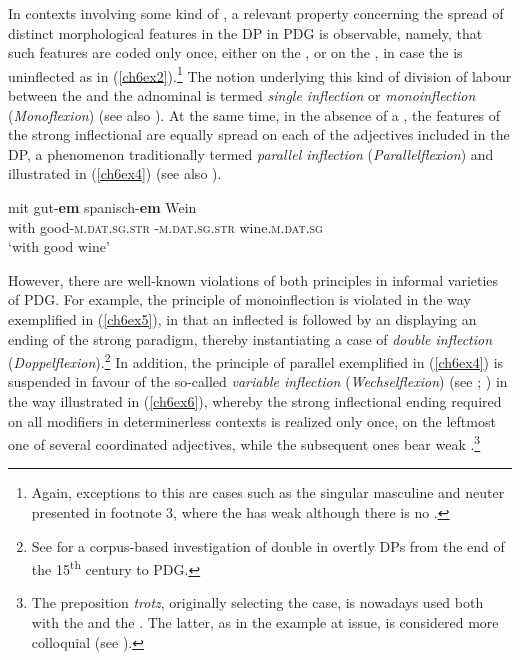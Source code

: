 \documentclass[output=paper,colorlinks,citecolor=brown]{langscibook}
\begin{document}
In contexts involving some kind of , a relevant property
concerning the spread of distinct morphological features in the DP in
PDG is observable, namely, that such features are coded only once, either
on the , or on the , in case the  is
uninflected as in (\ref{ch6ex2}).\footnote{Again, exceptions to this  are
  cases such as the  singular masculine and neuter presented in
  footnote 3, where the  has weak  although there is
  no .} The notion underlying this kind of division of labour
between the  and the adnominal  is termed
\emph{single inflection} or \emph{monoinflection} (\emph{Monoflexion})
(see also \citealp[954]{Duden16}). At the same time, in the absence of a
, the features of the strong inflectional  are equally
spread on each of the adjectives included in the DP, a phenomenon
traditionally termed \emph{parallel inflection} (\emph{Parallelflexion})
and illustrated in (\ref{ch6ex4}) (see also \citealp{Bildhauer2019}).

\begin{exe}
\ex\label{ch6ex4}
\gll mit gut-\textbf{em} spanisch-\textbf{em} Wein\\
with good-\textsc{m.dat.sg.str} -\textsc{m.dat.sg.str} wine.\textsc{m.dat.sg}\\
\glt `with good  wine'
\end{exe}

However, there are well-known violations of both principles in informal
varieties of PDG. For example, the principle of monoinflection is
violated in the way exemplified in (\ref{ch6ex5}), in that an inflected 
is followed by an  displaying an ending of the strong paradigm,
thereby instantiating a case of \emph{double inflection}
(\emph{Doppelflexion}).\footnote{See \cite{Niebuhr21} for a corpus-based
  investigation of double  in overtly  DPs from the
  end of the 15\textsuperscript{th} century to PDG.} In addition, the principle of
parallel  exemplified in (\ref{ch6ex4}) is suspended in favour of the 
so-called \emph{variable inflection} (\emph{Wechselflexion}) (see
\citealp{Bildhauer2019}; \citealp{MunzbergHansen20}) in the way illustrated
in (\ref{ch6ex6}), whereby the strong inflectional ending required on all modifiers
in determinerless contexts is realized only once, on the leftmost one
of several coordinated adjectives, while the subsequent ones bear weak
.\footnote{The preposition \emph{trotz}, originally selecting
  the  case, is nowadays used both with the  and the
  . The latter, as in the example at issue, is considered more
  colloquial (see \citealp{Vieregge19}).}
\end{document}
